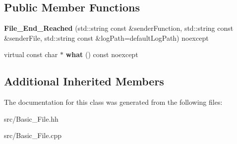\subsection*{Public Member Functions}
\begin{DoxyCompactItemize}
\item 
\hypertarget{classstb_1_1File__End__Reached_a77e1301490cc59e6b5d9a894eff5f06d}{{\bfseries File\+\_\+\+End\+\_\+\+Reached} (std\+::string const \&sender\+Function, std\+::string const \&sender\+File, std\+::string const \&log\+Path=default\+Log\+Path) noexcept}\label{classstb_1_1File__End__Reached_a77e1301490cc59e6b5d9a894eff5f06d}

\item 
\hypertarget{classstb_1_1File__End__Reached_a750bcec75d194f43d5d95441d6cf18df}{virtual const char $\ast$ {\bfseries what} () const noexcept}\label{classstb_1_1File__End__Reached_a750bcec75d194f43d5d95441d6cf18df}

\end{DoxyCompactItemize}
\subsection*{Additional Inherited Members}


The documentation for this class was generated from the following files\+:\begin{DoxyCompactItemize}
\item 
src/Basic\+\_\+\+File.\+hh\item 
src/Basic\+\_\+\+File.\+cpp\end{DoxyCompactItemize}
